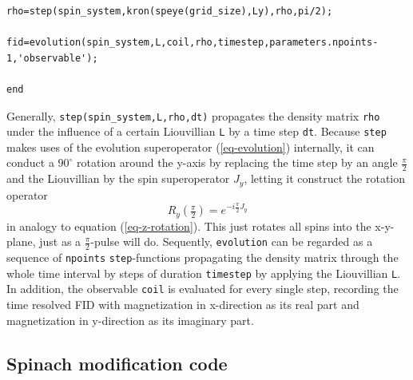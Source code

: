 \documentclass[11.5pt,a4paper]{article}
\begin{document}
\begin{lstlisting}[firstnumber=last]
% Apply the pulse
rho=step(spin_system,kron(speye(grid_size),Ly),rho,pi/2);

fid=evolution(spin_system,L,coil,rho,timestep,parameters.npoints-1,'observable');

end
\end{lstlisting}
Generally, \verb$step(spin_system,L,rho,dt)$ propagates the density matrix \verb$rho$ under the influence of a certain Liouvillian \verb$L$ by a time step \verb$dt$. Because \verb$step$ makes uses of the evolution superoperator (\ref{eq-evolution}) internally, it can conduct a $90^\circ$ rotation around the y-axis by replacing the time step by an angle $\tfrac{\pi}{2}$ and the Liouvillian by the spin superoperator $J_y$, letting it construct the rotation operator
\begin{equation}
 R_y (\tfrac{\pi}{2}) = e^{-i \tfrac{\pi}{2} J_y}
\end{equation}
in analogy to equation (\ref{eq-z-rotation}). This just rotates all spins into the x-y-plane, just as a $\tfrac{\pi}{2}$-pulse will do. 
Sequently, \verb$evolution$ can be regarded as a sequence of \verb$npoints$ \verb$step$-functions propagating the density matrix through the whole time interval by steps of duration \verb$timestep$ by applying the Liouvillian \verb$L$. In addition, the observable \verb$coil$ is evaluated for every single step, recording the time resolved FID with magnetization in x-direction as its real part and magnetization in y-direction as its imaginary part. 

\subsection{Spinach modification code}
\label{sec-spinach-mod-code}
\end{document}
